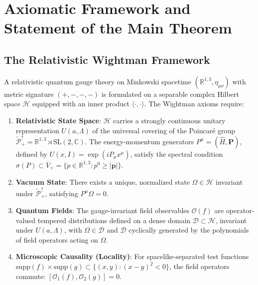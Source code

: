\documentclass[11pt,reqno]{amsart}
\theoremstyle{plain}
\theoremstyle{definition}
\theoremstyle{remark}
\numberwithin{equation}{section}
\begin{document}
\section{Axiomatic Framework and Statement of the Main Theorem}
\label{sec:axioms}

\subsection{The Relativistic Wightman Framework}
A relativistic quantum gauge theory on Minkowski spacetime $(\mathbb{R}^{1,3}, \eta_{\mu\nu})$ with metric signature $(+,-,-,-)$ is formulated on a separable complex Hilbert space $\mathcal{H}$ equipped with an inner product $\langle \cdot, \cdot \rangle$. The Wightman axioms \cite{StreaterWightman1964, JaffeWitten2000} require:
\begin{enumerate}
    \item[\textbf{W0}] \textbf{Relativistic State Space}: $\mathcal{H}$ carries a strongly continuous unitary representation $U(a, \Lambda)$ of the universal covering of the Poincaré group $\widetilde{\mathcal{P}}_+^\uparrow = \mathbb{R}^{1,3} \rtimes \mathrm{SL}(2, \mathbb{C})$. The energy-momentum generators $P^\mu = (\hat{H}, \mathbf{P})$, defined by $U(x, I) = \exp(i P_\mu x^\mu)$, satisfy the spectral condition $\sigma(P) \subset \overline{V}_+ = \{p \in \mathbb{R}^{1,3} : p^0 \ge |\mathbf{p}|\}$.
    \item[\textbf{W1}] \textbf{Vacuum State}: There exists a unique, normalized state $\Omega \in \mathcal{H}$ invariant under $\widetilde{\mathcal{P}}_+^\uparrow$, satisfying $P^\mu \Omega = 0$.
    \item[\textbf{W2}] \textbf{Quantum Fields}: The gauge-invariant field observables $\mathcal{O}(f)$ are operator-valued tempered distributions defined on a dense domain $\mathcal{D} \subset \mathcal{H}$, invariant under $U(a, \Lambda)$, with $\Omega \in \mathcal{D}$ and $\mathcal{D}$ cyclically generated by the polynomials of field operators acting on $\Omega$.
    \item[\textbf{W3}] \textbf{Microscopic Causality (Locality)}: For spacelike-separated test functions $\mathrm{supp}(f) \times \mathrm{supp}(g) \subset \{(x, y) : (x-y)^2 < 0\}$, the field operators commute: $[\mathcal{O}_1(f), \mathcal{O}_2(g)] = 0$.
\end{enumerate}
\end{document}

